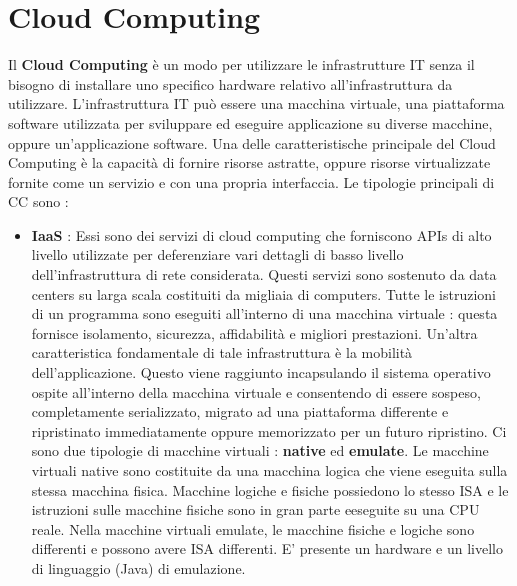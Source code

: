 \documentclass[12pt]{report}
\begin{document}
\chapter{Cloud Computing}
Il \textbf{Cloud Computing} è un modo per utilizzare le infrastrutture IT senza il bisogno di installare uno specifico hardware relativo all'infrastruttura da utilizzare. L'infrastruttura IT può essere una macchina virtuale, una piattaforma software utilizzata per sviluppare ed eseguire applicazione su diverse macchine, oppure un'applicazione software. Una delle caratteristische principale del Cloud Computing è la capacità di fornire risorse astratte, oppure risorse virtualizzate fornite come un servizio e con una propria interfaccia. Le tipologie principali di CC sono :
\begin{itemize}
\item \textbf{IaaS} : Essi sono dei servizi di cloud computing che forniscono APIs di alto livello utilizzate per deferenziare vari dettagli di basso livello dell'infrastruttura di rete considerata. Questi servizi sono sostenuto da data centers su larga scala costituiti da migliaia di computers. Tutte le istruzioni di un programma sono eseguiti all'interno di una macchina virtuale : questa fornisce isolamento, sicurezza, affidabilità e migliori prestazioni. Un'altra caratteristica fondamentale di tale infrastruttura è la mobilità dell'applicazione. Questo viene raggiunto incapsulando il sistema operativo ospite all'interno della macchina virtuale e consentendo di essere sospeso, completamente serializzato, migrato ad una piattaforma differente e ripristinato immediatamente oppure memorizzato per un futuro ripristino. Ci sono due tipologie di macchine virtuali : \textbf{native} ed \textbf{emulate}. Le macchine virtuali native sono costituite da una macchina logica che viene eseguita sulla stessa macchina fisica. Macchine logiche e fisiche possiedono lo stesso ISA e le istruzioni sulle macchine fisiche sono in gran parte eeseguite su una CPU reale. Nella macchine virtuali emulate, le macchine fisiche e logiche sono differenti e possono avere ISA differenti. E' presente un hardware e un livello di linguaggio (Java) di emulazione.

\end{itemize}
\end{document}
